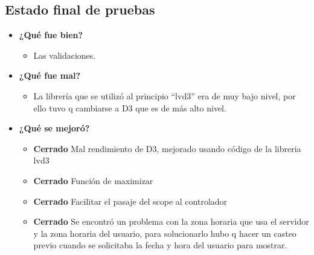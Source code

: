 \subsection{Estado final de pruebas}

	\begin{itemize}
		\item \textbf{¿Qué fue bien?}
        	\begin{itemize}
				\item        Las validaciones.
			\end{itemize}
            
		\item \textbf{¿Qué fue mal?}
        	\begin{itemize}
				\item        La librería que se utilizó al principio ``lvd3'' era de muy bajo nivel, por ello tuvo q cambiarse a D3 que es de más alto nivel. 
			\end{itemize}
            
   		\item \textbf{¿Qué se mejoró?}
        	\begin{itemize}
            	\item \textbf{Cerrado} Mal rendimiento de D3, mejorado usando código de la libreria lvd3
            	\item \textbf{Cerrado} Función de maximizar
                \item \textbf{Cerrado} Facilitar el pasaje del scope al controlador
                \item \textbf{Cerrado} Se encontró un problema con la zona horaria que usa el servidor y la zona horaria del usuario, para solucionarlo hubo q hacer un casteo previo cuando se solicitaba la fecha y hora del usuario para mostrar.
			\end{itemize}
       
	\end{itemize}